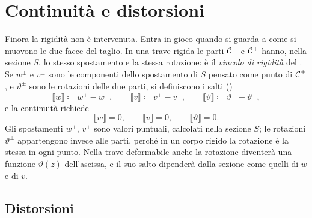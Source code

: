 \section{Continuità e distorsioni}
\label{sec:continuita_trave}

Finora la rigidità non è intervenuta. Entra in gioco
quando si guarda a come si muovono le due facce del
taglio. In una trave rigida le parti $\mathcal{C}^-$ e $\mathcal{C}^+$
hanno, nella sezione $S$, lo stesso spostamento e la
stessa rotazione: è il \emph{vincolo di
	rigidità} del
. Se $w^\pm$ e $v^\pm$ sono le
componenti dello spostamento di $S$ pensato come punto
di $\mathcal{C}^\pm$, e $\vartheta^\pm$ sono le rotazioni delle
due parti, si definiscono i salti
()
\begin{equation}\label{eq:salti_cinematici}
	\llbracket w \rrbracket \coloneqq w^+ - w^-, \qquad
	\llbracket v \rrbracket \coloneqq v^+ - v^-, \qquad
	\llbracket \vartheta \rrbracket \coloneqq \vartheta^+ - \vartheta^-,
\end{equation}
e la continuità richiede
\begin{equation}\label{eq:rigidita_perfetta}
	\llbracket w \rrbracket = 0, \qquad
	\llbracket v \rrbracket = 0, \qquad
	\llbracket \vartheta \rrbracket = 0.
\end{equation}
Gli spostamenti $w^\pm$, $v^\pm$ sono valori puntuali,
calcolati nella sezione $S$; le rotazioni $\vartheta^\pm$
appartengono invece alle parti, perché in un corpo rigido
la rotazione è la stessa in ogni punto. Nella trave
deformabile anche la rotazione diventerà una funzione
$\vartheta(z)$ dell'ascissa, e il suo salto dipenderà
dalla sezione come quelli di $w$ e di $v$.

\subsection{Distorsioni}
\label{sec:distorsioni}

